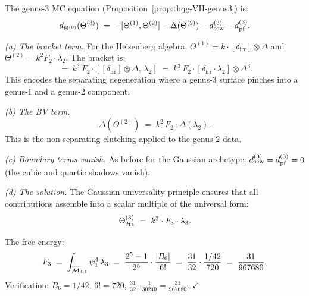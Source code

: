 \begin{computation}
The genus-$3$ MC equation
(Proposition~\ref{prop:thqg-VII-genus3}) is:
\begin{equation}%
d_{\Theta^{(0)}}(\Theta^{(3)})
\;=\;
-[\Theta^{(1)},\Theta^{(2)}]
- \Delta(\Theta^{(2)})
- \dsew^{(3)}
- \dpf^{(3)}.
\end{equation}

\medskip\noindent\emph{(a) The bracket term.}
For the Heisenberg algebra, $\Theta^{(1)} = k \cdot
[\delta_{\mathrm{irr}}] \otimes \Delta$ and
$\Theta^{(2)} = k^2 F_2 \cdot \lambda_2$. The bracket is:
\begin{equation}%
[\Theta^{(1)},\Theta^{(2)}]
\;=\;
k^3 \, F_2 \cdot
[[\delta_{\mathrm{irr}}] \otimes \Delta,\, \lambda_2]
\;=\;
k^3 \, F_2 \cdot [\delta_{\mathrm{irr}} \cdot \lambda_2]
\otimes \Delta^3.
\end{equation}
This encodes the separating degeneration where a genus-$3$
surface pinches into a genus-$1$ and a genus-$2$ component.

\medskip\noindent\emph{(b) The BV term.}
\begin{equation}%
\Delta(\Theta^{(2)})
\;=\;
k^2 \, F_2 \cdot \Delta(\lambda_2).
\end{equation}
This is the non-separating clutching applied to the genus-$2$
data.

\medskip\noindent\emph{(c) Boundary terms vanish.}
As before for the Gaussian archetype:
$d_{\mathrm{sew}}^{(3)} = d_{\mathrm{pf}}^{(3)} = 0$ (the cubic and quartic
shadows vanish).

\medskip\noindent\emph{(d) The solution.}
The Gaussian universality principle ensures that all
contributions assemble into a scalar multiple of the universal
form:
\begin{equation}%
\Theta^{(3)}_{\cH_k}
\;=\;
k^3 \cdot F_3 \cdot \lambda_3.
\end{equation}

The free energy:
\begin{equation}%
F_3
\;=\;
\int_{\overline{\cM}_{3,1}} \psi_1^{4}\,\lambda_3
\;=\;
\frac{2^5 - 1}{2^5} \cdot \frac{|B_6|}{6!}
\;=\;
\frac{31}{32} \cdot \frac{1/42}{720}
\;=\;
\frac{31}{967680}.
\end{equation}
Verification: $B_6 = 1/42$, $6! = 720$,
$\frac{31}{32} \cdot \frac{1}{30240} = \frac{31}{967680}$. $\checkmark$
\end{computation}

